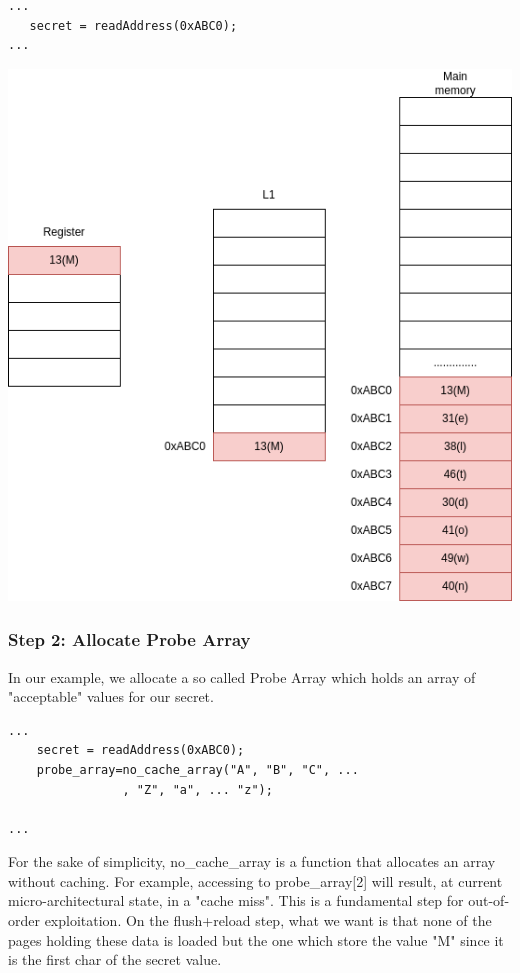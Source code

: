 \begin{verbatim}
...
   secret = readAddress(0xABC0);
...
\end{verbatim}
\includegraphics[scale=0.25]{img/meltdown-step-one.png}


\subsubsection{Step 2: Allocate Probe Array}
In our example, we allocate a so called Probe Array which holds an array of "acceptable" values for our secret.
\begin{verbatim}
...
    secret = readAddress(0xABC0);
    probe_array=no_cache_array("A", "B", "C", ... 
                , "Z", "a", ... "z");

...
\end{verbatim}
For the sake of simplicity, no\_cache\_array is a function that allocates an array without caching.
For example, accessing to probe\_array[2] will result, at current micro-architectural state, in a "cache miss".
This is a fundamental step for out-of-order exploitation.
On the flush+reload step, what we want is that none of the pages holding these data is loaded but the one which store the value
"M" since it is the first char of the secret value.

